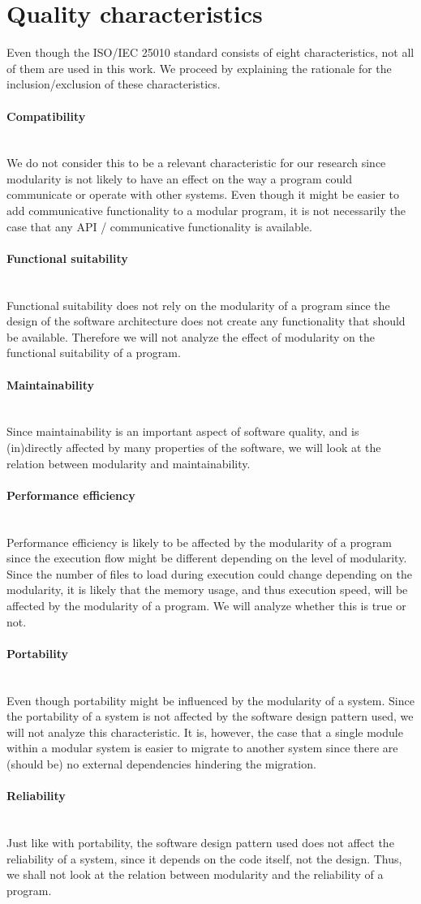 \documentclass[twoside]{uva-inf-bachelor-thesis}
\newcommand{\myparagraph}[1]{\paragraph{#1}\mbox{}\\}
\begin{document}
\section{Quality characteristics}
Even though the ISO/IEC 25010 standard consists of eight characteristics, not all of them are used in this work. We proceed by explaining the rationale for the inclusion/exclusion of these characteristics.

\myparagraph{Compatibility}
We do not consider this to be a relevant characteristic for our research since modularity is not likely to have an effect on the way a program could communicate or operate with other systems. Even though it might be easier to add communicative functionality to a modular program, it is not necessarily the case that any API / communicative functionality is available.

\myparagraph{Functional suitability}
Functional suitability does not rely on the modularity of a program since the design of the software architecture does not create any functionality that should be available. Therefore we will not analyze the effect of modularity on the functional suitability of a program.

\myparagraph{Maintainability}
Since maintainability is an important aspect of software quality, and is (in)directly affected by many properties of the software, we will look at the relation between modularity and maintainability.

\myparagraph{Performance efficiency}
Performance efficiency is likely to be affected by the modularity of a program since the execution flow might be different depending on the level of modularity. Since the number of files to load during execution could change depending on the modularity, it is likely that the memory usage, and thus execution speed, will be affected by the modularity of a program. We will analyze whether this is true or not.

\myparagraph{Portability}
Even though portability might be influenced by the modularity of a system. Since the portability of a system is not affected by the software design pattern used, we will not analyze this characteristic. It is, however, the case that a single module within a modular system is easier to migrate to another system since there are (should be) no external dependencies hindering the migration.

\myparagraph{Reliability}
Just like with portability, the software design pattern used does not affect the reliability of a system, since it depends on the code itself, not the design. Thus, we shall not look at the relation between modularity and the reliability of a program.
\end{document}
